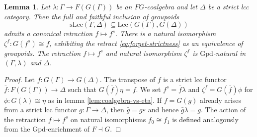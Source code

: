 \documentclass[a4paper]{article}
\newtheorem{lemma}[theorem]{Lemma}
\theoremstyle{remark}
\theoremstyle{definition}
\begin{document}
\begin{lemma}
  \label{lem:strictification}
  Let $\lambda : \Gamma \rightarrow F(G(\Gamma))$ be an $FG$-coalgebra and let $\Delta$ be a strict lcc category.
  Then the full and faithful inclusion of groupoids
  \begin{equation}
    \label{eq:forget-strictness}
    \mathrm{sLcc}(\Gamma, \Delta) \subseteq \mathrm{Lcc}(G(\Gamma), G(\Delta))
  \end{equation}
  admits a canonical retraction $f \mapsto f^s$.
  There is a natural isomorphism $\zeta^f : G(f^s) \cong f$, exhibiting the retract \eqref{eq:forget-strictness} as an equivalence of groupoids.
  The retraction $f \mapsto f^s$ and natural isomorphism $\zeta^f$ is $\mathrm{Gpd}$-natural in $(\Gamma, \lambda)$ and $\Delta$.
\end{lemma}
\begin{proof}
  Let $f : G(\Gamma) \rightarrow G(\Delta)$.
  The transpose of $f$ is a strict lcc functor $\bar f : F(G(\Gamma)) \rightarrow \Delta$ such that $G(\bar f) \eta = f$.
  We set $f^s = \bar f \lambda$ and $\zeta^f = G(\bar f) \phi$ for $\phi : G(\lambda) \cong \eta$ as in lemma \ref{lem:coalgebra-vs-eta}.
  If $f = G(g)$ already arises from a strict lcc functor $g : \Gamma \rightarrow \Delta$, then $\bar g = g \varepsilon$ and hence $\bar g \lambda = g$.
  The action of the retraction $f \mapsto f^s$ on natural isomorphisms $f_0 \cong f_1$ is defined analogously from the $\mathrm{Gpd}$-enrichment of $F \dashv G$.
\end{proof}
\end{document}
